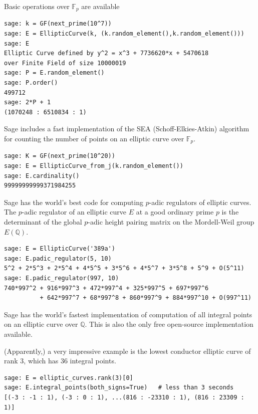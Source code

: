 \documentclass[10pt]{beamer}
\newcommand{\field}[1]{\mathbb{#1}}
\newcommand{\F}{\field{F}}
\begin{document}
\begin{frame}
\framebreak

Basic operations over $\mathbb{F}_p$ are available

\begin{lstlisting}
sage: k = GF(next_prime(10^7))
sage: E = EllipticCurve(k, (k.random_element(),k.random_element()))
sage: E
Elliptic Curve defined by y^2 = x^3 + 7736620*x + 5470618
over Finite Field of size 10000019
sage: P = E.random_element()
sage: P.order()
499712
sage: 2*P + 1
(1070248 : 6510834 : 1)
\end{lstlisting}


\framebreak

Sage includes a fast implementation of the SEA (Schoff-Elkies-Atkin) algorithm for counting the number of points on an elliptic curve over $\F_p$.

\begin{lstlisting}
sage: K = GF(next_prime(10^20))
sage: E = EllipticCurve_from_j(k.random_element())
sage: E.cardinality()
99999999999371984255
\end{lstlisting}

Sage has the world's best code for computing $p$-adic regulators of elliptic curves. The $p$-adic regulator of an elliptic curve $E$ at a good ordinary prime $p$ is the determinant of the global $p$-adic height pairing matrix on the Mordell-Weil group $E(\mathbb{Q})$.

\begin{lstlisting}
sage: E = EllipticCurve('389a')
sage: E.padic_regulator(5, 10)
5^2 + 2*5^3 + 2*5^4 + 4*5^5 + 3*5^6 + 4*5^7 + 3*5^8 + 5^9 + O(5^11)
sage: E.padic_regulator(997, 10)
740*997^2 + 916*997^3 + 472*997^4 + 325*997^5 + 697*997^6
          + 642*997^7 + 68*997^8 + 860*997^9 + 884*997^10 + O(997^11)
\end{lstlisting}

\framebreak

Sage has the world's fastest implementation of computation of all integral points on an elliptic curve over $\mathbb{Q}$. This is also the only free open-source implementation available.

\vspace{1em}

(Apparently,) a very impressive example is the lowest conductor elliptic curve of rank $3$, which has 36 integral points.

\begin{lstlisting}
sage: E = elliptic_curves.rank(3)[0]
sage: E.integral_points(both_signs=True)   # less than 3 seconds
[(-3 : -1 : 1), (-3 : 0 : 1), ...(816 : -23310 : 1), (816 : 23309 : 1)]
\end{lstlisting}

\end{frame}
\end{document}
